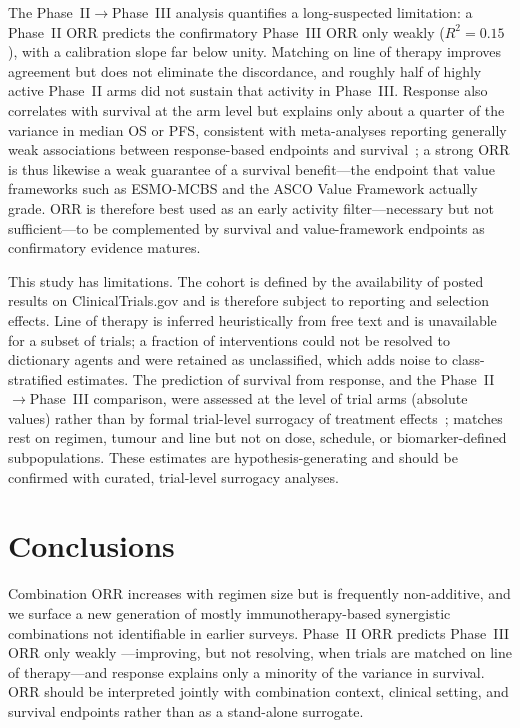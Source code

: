 \documentclass[cancers,article,submit,pdftex,moreauthors]{Definitions/mdpi}
\begin{document}
The Phase~II$\rightarrow$Phase~III analysis quantifies a long-suspected limitation: a
Phase~II ORR predicts the confirmatory Phase~III ORR only weakly ($R^{2}=0.15$),
with a calibration slope far below unity. Matching on line of therapy improves
agreement but does not eliminate the discordance, and roughly half of highly active
Phase~II arms did not sustain that activity in Phase~III. Response also correlates
with survival at the arm level but explains only about a quarter of the variance in
median OS or PFS, consistent with meta-analyses reporting generally weak associations
between response-based endpoints and survival~\cite{prasad2015,blumenthal2015}; a
strong ORR is thus likewise a weak guarantee of a survival benefit---the endpoint
that value frameworks such as ESMO-MCBS and the ASCO Value Framework actually grade.
ORR is therefore best used as an early activity filter---necessary but not
sufficient---to be complemented by survival and value-framework endpoints as
confirmatory evidence matures.

This study has limitations. The cohort is defined by the availability of posted
results on ClinicalTrials.gov and is therefore subject to reporting and selection
effects. Line of therapy is inferred heuristically from free text and is unavailable
for a subset of trials; a fraction of interventions could not be resolved to
dictionary agents and were retained as unclassified, which adds noise to
class-stratified estimates. The prediction of survival from response, and the
Phase~II$\rightarrow$Phase~III comparison, were assessed at the level of trial arms
(absolute values) rather than by formal trial-level surrogacy of treatment
effects~\cite{prentice1989,buyse2000}; matches rest on regimen, tumour and line but
not on dose, schedule, or biomarker-defined subpopulations. These estimates are
hypothesis-generating and should be confirmed with curated, trial-level surrogacy
analyses.

\section{Conclusions}
Combination ORR increases with regimen size but is frequently non-additive, and we
surface a new generation of mostly immunotherapy-based synergistic combinations not
identifiable in earlier surveys. Phase~II ORR predicts Phase~III ORR only weakly
---improving, but not resolving, when trials are matched on line of therapy---and
response explains only a minority of the variance in survival. ORR should be
interpreted jointly with combination context, clinical setting, and survival
endpoints rather than as a stand-alone surrogate.
\end{document}
